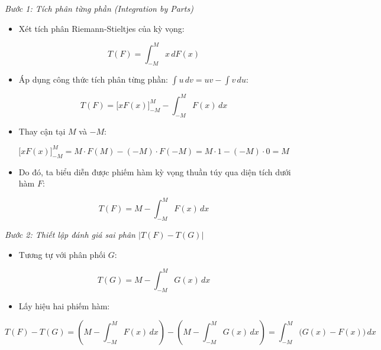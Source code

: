 \documentclass[12pt,a4paper]{article}
\begin{document}
\emph{Bước 1: Tích phân từng phần (Integration by Parts)}

\begin{itemize}

\item
  Xét tích phân Riemann-Stieltjes của kỳ vọng:
\end{itemize}

\[T(F) = \int_{-M}^M x \, dF(x)\]

\begin{itemize}

\item
  Áp dụng công thức tích phân từng phần: \(\int u\, dv = uv - \int v\, du\):
\end{itemize}

\[T(F) = \Big[ x F(x) \Big]_{-M}^{M} - \int_{-M}^M F(x) \, dx\]

\begin{itemize}

\item
  Thay cận tại \(M\) và \(-M\):
\end{itemize}

\[\Big[ x F(x) \Big]_{-M}^{M} = M \cdot F(M) - (-M) \cdot F(-M) = M \cdot 1 - (-M) \cdot 0 = M\]

\begin{itemize}

\item
  Do đó, ta biểu diễn được phiếm hàm kỳ vọng thuần túy qua diện tích dưới hàm \(F\):
\end{itemize}

\[T(F) = M - \int_{-M}^M F(x) \, dx\]

\emph{Bước 2: Thiết lập đánh giá sai phân \(\vert{}T(F) - T(G)\vert{}\)}

\begin{itemize}

\item
  Tương tự với phân phối \(G\):
\end{itemize}

\[T(G) = M - \int_{-M}^M G(x) \, dx\]

\begin{itemize}

\item
  Lấy hiệu hai phiếm hàm:
\end{itemize}

\[T(F) - T(G) = \left( M - \int_{-M}^M F(x) \, dx \right) - \left( M - \int_{-M}^M G(x) \, dx \right) = \int_{-M}^M \big(G(x) - F(x)\big) \, dx\]
\end{document}
